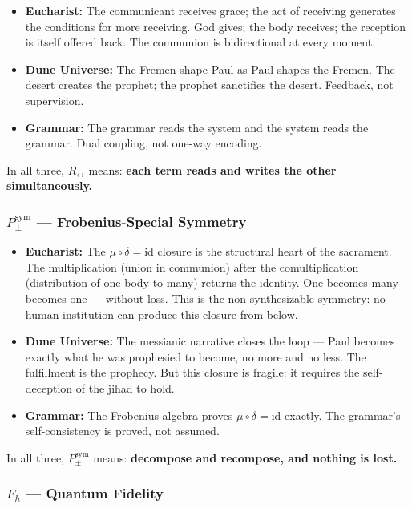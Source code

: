 \documentclass[12pt,a4paper]{article}
\begin{document}
\begin{itemize}
    \item \textbf{Eucharist:} The communicant receives grace; the act of receiving generates the conditions for more receiving. God gives; the body receives; the reception is itself offered back. The communion is bidirectional at every moment.
    \item \textbf{Dune Universe:} The Fremen shape Paul as Paul shapes the Fremen. The desert creates the prophet; the prophet sanctifies the desert. Feedback, not supervision.
    \item \textbf{Grammar:} The grammar reads the system and the system reads the grammar. Dual coupling, not one-way encoding.
\end{itemize}

In all three, $R_{\leftrightarrow}$ means: \textbf{each term reads and writes the other simultaneously.}

\subsubsection{$P_{\pm}^{\text{sym}}$ --- Frobenius-Special Symmetry}

\begin{itemize}
    \item \textbf{Eucharist:} The $\mu \circ \delta = \text{id}$ closure is the structural heart of the sacrament. The multiplication (union in communion) after the comultiplication (distribution of one body to many) returns the identity. One becomes many becomes one --- without loss. This is the non-synthesizable symmetry: no human institution can produce this closure from below.
    \item \textbf{Dune Universe:} The messianic narrative closes the loop --- Paul becomes exactly what he was prophesied to become, no more and no less. The fulfillment is the prophecy. But this closure is fragile: it requires the self-deception of the jihad to hold.
    \item \textbf{Grammar:} The Frobenius algebra proves $\mu \circ \delta = \text{id}$ exactly. The grammar's self-consistency is proved, not assumed.
\end{itemize}

In all three, $P_{\pm}^{\text{sym}}$ means: \textbf{decompose and recompose, and nothing is lost.}

\subsubsection{$F_{\hbar}$ --- Quantum Fidelity}
\end{document}
